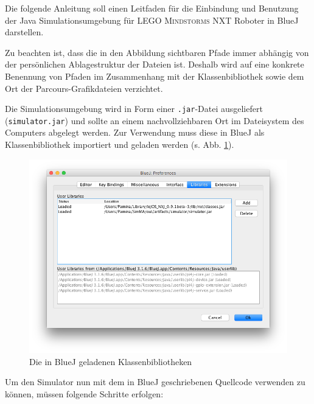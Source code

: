 \documentclass[paper=a4, DIV=calc, BCOR=12mm, twoside=on, onecolumn=on, open = right, titlepage =on, parskip =half-, headsepline = on, footsepline = off, chapterprefix = off, appendixprefix = on, fontsize = 12pt, numbers = noenddot, abstract = on]{scrbook}
\begin{document}
\newpage

\newpage


Die folgende Anleitung soll einen Leitfaden für die Einbindung und Benutzung der Java Simulationsumgebung für \textsc{LEGO Mindstorms} NXT Roboter in BlueJ darstellen.

Zu beachten ist, dass die in den Abbildung sichtbaren Pfade immer abhängig von der persönlichen Ablagestruktur der Dateien ist. Deshalb wird auf eine konkrete Benennung von Pfaden im Zusammenhang mit der Klassenbibliothek sowie dem Ort der Parcours-Grafikdateien verzichtet.




Die Simulationsumgebung wird in Form einer \texttt{.jar}-Datei ausgeliefert (\texttt{simulator.jar}) und sollte an einem nachvollziehbaren Ort im Dateisystem des Computers abgelegt werden. Zur Verwendung muss diese in BlueJ als Klassenbibliothek importiert und geladen werden (s. Abb. \ref{fig:library}).

\begin{figure}[htbp]
\centering
\includegraphics[width=\textwidth]{images/Anleitung_Library.png}
\caption{Die in BlueJ geladenen Klassenbibliotheken}
\label{fig:library}
\end{figure}


Um den Simulator nun mit dem in BlueJ geschriebenen Quellcode verwenden zu können, müssen folgende Schritte erfolgen:
\end{document}
